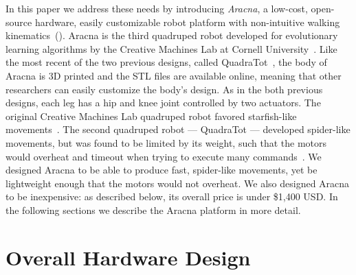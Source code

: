 \documentclass[letterpaper]{article}
\begin{document}
In this paper we address these needs by introducing \emph{Aracna}, a low-cost, open-source hardware, easily customizable robot platform with non-intuitive walking
kinematics~(). Aracna is the third quadruped robot developed for evolutionary learning algorithms by the Creative Machines Lab at Cornell University~\citep{bongard2006resilient, yosinski2011gaits}. Like the most recent of the two previous designs, called QuadraTot~\citep{yosinski2011gaits}, the body of Aracna is 3D printed and the STL files are available online,
meaning that other researchers can easily customize the body's design. As in the both previous designs, each leg has a hip and knee joint controlled by two actuators. The original Creative
Machines Lab quadruped robot favored starfish-like movements~\citep{bongard2006resilient}. The second quadruped robot --- QuadraTot ---
developed spider-like movements, but was found to be limited by its
weight, such that the motors would overheat and timeout when trying to execute many commands~\citep{yosinski2011gaits, Glette2012Evolution}. We designed Aracna to be able to produce fast, spider-like movements, yet be lightweight enough that the motors would not overheat. We also designed Aracna to be inexpensive: as described below, its overall price is under \$1,400  USD. In the following sections we describe the Aracna platform in more detail. 




\section{Overall Hardware Design}





\end{document}
